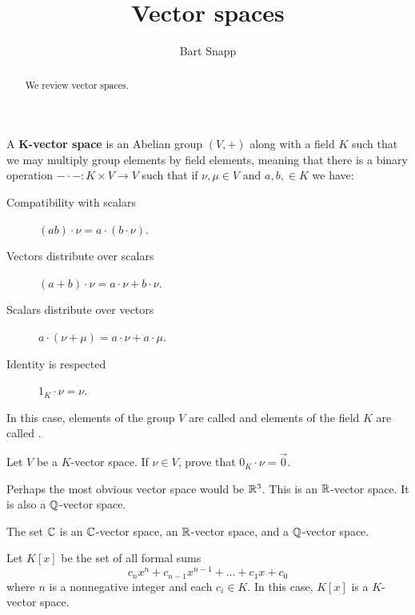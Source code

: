 \documentclass{ximera}
\author{Bart Snapp}
\title{Vector spaces}
\begin{document}
\begin{abstract}
  We review vector spaces.
\end{abstract}
\maketitle



\begin{definition}
  A \textbf{$\boldsymbol{K}$-vector space} is an Abelian group $(V,+)$
  along with a field $K$ such that we may multiply group elements by
  field elements, meaning that there is a binary operation $-\cdot-:
  K\times V \to V$ such that if $\nu,\mu\in V$ and $a,b,\in K$ we
  have:
\begin{description}
\item[Compatibility with scalars] $(ab)\cdot \nu = a\cdot (b\cdot \nu)$.
\item[Vectors distribute over scalars] $(a+b)\cdot \nu =
  a\cdot\nu + b\cdot \nu$.
\item[Scalars distribute over vectors] $a\cdot (\nu+\mu) =
  a\cdot \nu + a\cdot \mu$.
\item[Identity is respected] $1_K\cdot \nu = \nu$.
\end{description}
In this case, elements of the group $V$ are called  and
elements of the field $K$ are called .
\end{definition}

\begin{exercise}
  Let $V$ be a $K$-vector space. If $\nu\in V$, prove that
  $0_K\cdot \nu = \vec{0}$.
\end{exercise}


\begin{example}
  Perhaps the most obvious vector space would be $\mathbb R^3$. This is an
  $\mathbb R$-vector space. It is also a $\mathbb Q$-vector space.
\end{example}



\begin{example}
  The set $\mathbb C$ is an $\mathbb C$-vector space, an $\mathbb R$-vector space, and a
  $\mathbb Q$-vector space.
\end{example}


\begin{example}[Polynomials]
  Let $K[x]$ be the set of all formal sums
  \[
  c_nx^n + c_{n-1}x^{n-1} + \dots + c_1 x + c_0
  \]
  where $n$ is a nonnegative integer and each $c_i \in K$. In this
  case, $K[x]$ is a $K$-vector space.
\end{example}
\end{document}
